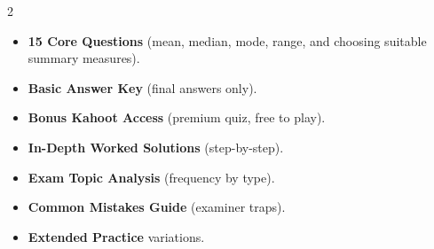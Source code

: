 \documentclass[11pt,a4paper]{article}
\newcommand{\FullReleaseDate}{April 30, 2026}
\begin{document}
\vspace{8pt}

\begin{multicols}{2}
  \begin{tcolorbox}[card, title=\sffamily\bfseries\textcolor{white}{\faHandPointDown\ TODAY (Simplified Version)}, colbacktitle=mainblue, boxed title style={sharp corners, boxrule=0pt}]
    \begin{itemize}[leftmargin=1.2em, itemsep=2pt]
      \item \small \textbf{15 Core Questions} (mean, median, mode, range, and choosing suitable summary measures).
      \item \small \textbf{Basic Answer Key} (final answers only).
      \item \small \textbf{Bonus Kahoot Access} (premium quiz, free to play).
    \end{itemize}
  \end{tcolorbox}

  \columnbreak

  \begin{tcolorbox}[card, title=\sffamily\bfseries\textcolor{white}{\faRocket\ ON \FullReleaseDate\ (Full Upgrade)}, colbacktitle=mainblue, boxed title style={sharp corners, boxrule=0pt}]
    \begin{itemize}[leftmargin=1.2em, itemsep=2pt]
      \item \small \textbf{In-Depth Worked Solutions} (step-by-step).
      \item \small \textbf{Exam Topic Analysis} (frequency by type).
      \item \small \textbf{Common Mistakes Guide} (examiner traps).
      \item \small \textbf{Extended Practice} variations.
    \end{itemize}
  \end{tcolorbox}
\end{multicols}
\end{document}
